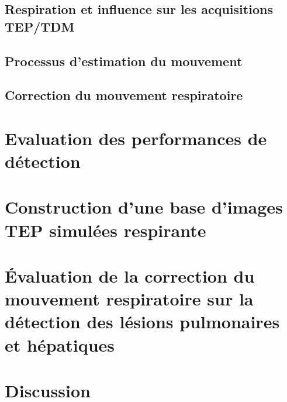 \documentclass[12pt]{book}
\begin{document}
	\chapter{Respiration et influence sur les acquisitions TEP/TDM}
	
	
	\chapter{Processus d'estimation du mouvement}
	
	
	\chapter{Correction du mouvement respiratoire}
	

\part{Evaluation des performances de détection}
	



\part{Construction d'une base d'images TEP simulées respirante}
	

	



\part{\'Evaluation de la correction du mouvement respiratoire sur la détection des lésions pulmonaires et hépatiques}
	


\part{Discussion}

	


\newpage
{}




\listoffigures


\listoftables





\end{document}
